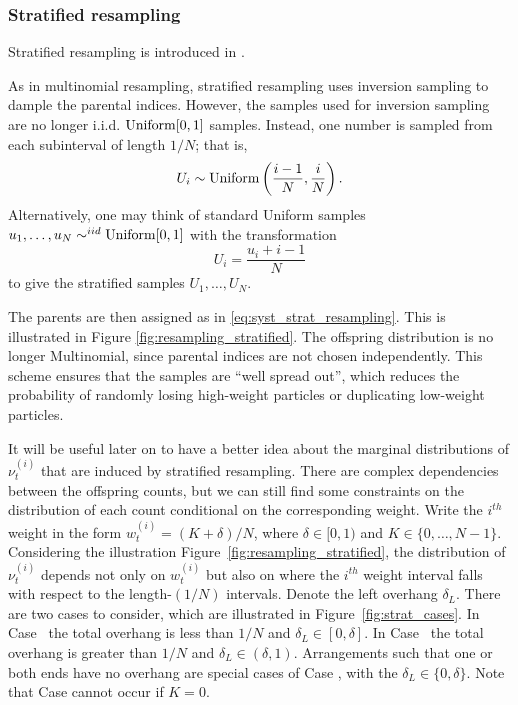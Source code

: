 \subsubsection{Stratified resampling}
Stratified resampling is introduced in \cite{kitagawa1996}.

As in multinomial resampling, stratified resampling uses inversion sampling to dample the parental indices. However, the samples used for inversion sampling are no longer i.i.d. $\operatorname{Uniform}[0,1]$ samples. Instead, one number is sampled from each subinterval of length $1/N$; that is, 
\begin{equation*}
U_i \sim \operatorname{Uniform} \left(\frac{i-1}{N}, \frac{i}{N} \right) .
\end{equation*}
Alternatively, one may think of standard Uniform samples $u_1,\dots,u_N \sim^{iid} \operatorname{Uniform}[0,1]$ with the transformation
\begin{equation*}
U_i = \frac{u_i + i -1}{N}
\end{equation*}
to give the stratified samples $U_1,\dots,U_N$.

The parents are then assigned as in \eqref{eq:syst_strat_resampling}.
This is illustrated in Figure \ref{fig:resampling_stratified}.
The offspring distribution is no longer Multinomial, since parental indices are not chosen independently.
This scheme ensures that the samples are ``well spread out'', which reduces the probability of randomly losing high-weight particles or duplicating low-weight particles.

It will be useful later on to have a better idea about the marginal distributions of $\nu_t^{(i)}$ that are induced by stratified resampling. There are complex dependencies between the offspring counts, but we can still find some constraints on the distribution of each count conditional on the corresponding weight.
Write the $i^{th}$ weight in the form $w_t^{(i)} = (K + \delta)/N$, where $\delta \in [0,1)$ and $K\in \{0,\dots,N-1\}$.
Considering the illustration Figure~\ref{fig:resampling_stratified}, the distribution of $\nu_t^{(i)}$ depends not only on $w_t^{(i)}$ but also on where the $i^{th}$ weight interval falls with respect to the length-$(1/N)$ intervals. 
Denote the left overhang $\delta_L$.
There are two cases to consider, which are illustrated in Figure~\ref{fig:strat_cases}.
In Case~ the total overhang is less than $1/N$ and $\delta_L \in [0,\delta]$.
In Case~ the total overhang is greater than $1/N$ and $\delta_L \in (\delta, 1)$.
Arrangements such that one or both ends have no overhang are special cases of Case , with the $\delta_L \in \{0,\delta\}$.
Note that Case  cannot occur if $K=0$.

